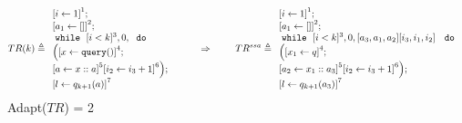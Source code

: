 \documentclass[a4paper,11pt]{article}
\begin{document}
\begin{example}
\[
{
TR(k) \triangleq
{
\begin{array}{l}
    \left[i \leftarrow 1 \right]^1 ; \\
    \left[a_1 \leftarrow [] \right]^2; \\
   \ewhile ~ [i < k]^{3}, 0,     ~ \edo ~ \\
    \Big(
     \clabel{x \leftarrow \query() }^4 ; \\
    \clabel{a \leftarrow x :: a }^5  
        \left[i_2 \leftarrow i_3 + 1 \right]^6 
   \Big);\\
    \clabel{l \leftarrow q_{k + 1}(a)}^{7}\\
\end{array}
}
%
~~~~~~~~ \Rightarrow ~~~~~~~
%
TR^{ssa} \triangleq
\begin{array}{l}
    \left[i \leftarrow 1 \right]^1 ; \\
    \left[a_1 \leftarrow [] \right]^2; \\
   \ewhile ~ [i < k]^{3}, 0, 
   [ a_3,a_1,a_2 ] [ i_3,i_1,i_2 ] ~ 
    ~ \edo ~ \\
   \Big( 
     \left[x_1 \leftarrow q \right]^4; \\
    \left[a_2 \leftarrow x_1 :: a_3 \right]^5 
    \left[i_2 \leftarrow i_3 + 1 \right]^6 
    \Big);\\
    \clabel{l \leftarrow q_{k + 1}(a_3)}^{7}\\
\end{array}
}
\]
Adapt($TR$) = 2


\end{example}
\end{document}
